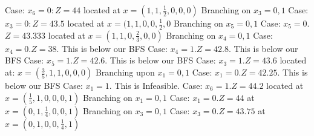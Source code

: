 \documentclass[10pt, letterpaper]{paper}
\begin{document}
\indent \indent Case: $x_6 = 0: Z=44$ located at $x=(1,1,\frac{1}{2},0,0,0)$
\indent \indent \newline
\indent \indent Branching on $x_3 = 0,1$
\indent \indent \newline
\indent \indent \indent Case: $x_3 = 0: Z=43.5$ located at $x=(1,1,0,0,\frac{1}{2},0$
\indent \indent \indent \newline
\indent \indent \indent Branching on $x_5 = 0,1$
\indent \indent \indent \newline
\indent \indent \indent \indent Case: $x_5 = 0.$ $Z = 43.333$ located at $x=(1,1,0,\frac{2}{3},0,0)$
\indent \indent \indent \indent \newline
\indent \indent \indent \indent Branching on $x_4 = 0,1$
\indent \indent \indent \indent \newline
\indent \indent \indent \indent \indent Case: $x_4 = 0. Z = 38.$ This is below our BFS
\indent \indent \indent \indent \indent \newline
\indent \indent \indent \indent \indent Case: $x_4 = 1. Z = 42.8.$ This is below our BFS
\indent \indent \indent \indent \indent \newline
\indent \indent \indent \indent Case: $x_5 = 1. Z = 42.6.$ This is below our BFS
\indent \indent \indent \indent \newline
\indent \indent \indent Case: $x_3 = 1. Z=43.6$ located at: $x=(\frac{3}{5},1,1,0,0,0)$
\indent \indent \indent \newline
\indent \indent \indent Branching upon $x_1 = 0,1$
\indent \indent \indent \newline
\indent \indent \indent \indent Case: $x_1 = 0. Z=42.25.$ This is below our BFS
\indent \indent \indent \indent \newline
\indent \indent \indent \indent Case: $x_1 = 1.$ This is Infeasible.
\indent \indent \indent \indent \newline
\indent \indent Case: $x_6 = 1. Z=44.2$ located at $x=(\frac{1}{5},1,0,0,0,1)$
\indent \indent \newline
\indent \indent Branching on $x_1 = 0,1$
\indent \indent \newline
\indent \indent \indent Case: $x_1 = 0. Z=44$ at $x=(0,1,\frac{1}{4},0,0,1)$
\indent \indent \indent \newline
\indent \indent \indent Branching on $x_3 = 0,1$
\indent \indent \indent \newline
\indent \indent \indent \indent Case: $x_3 = 0. Z=43.75$ at $x=(0,1,0,0,\frac{1}{4}, 1)$
\indent \indent \indent \indent \newline
\end{document}
